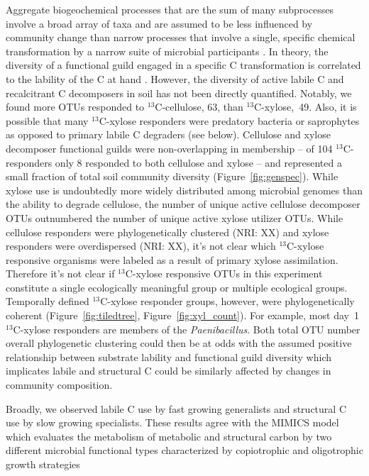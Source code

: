 Aggregate biogeochemical processes that are the sum of
many subprocesses involve a broad array of taxa and are assumed to be less
influenced by community change than narrow processes that involve a single,
specific chemical transformation by a narrow suite of microbial participants
\citep{Schimel_1995,McGuire2010}. In theory, the diversity of a functional
guild engaged in a specific C transformation is correlated to the lability of
the C at hand \citep{McGuire2010}. However, the diversity of active labile C and
recalcitrant C decomposers in soil has not been directly quantified. Notably,
we found more OTUs responded to $^{13}$C-cellulose, 63, than
$^{13}$C-xylose,~49. Also, it is possible that many $^{13}$C-xylose responders
were predatory bacteria or saprophytes as opposed to primary labile C degraders
(see below). Cellulose and xylose decomposer functional guilds were
non-overlapping in membership -- of 104 $^{13}$C-responders only 8 responded to
both cellulose and xylose -- and represented a small fraction of total soil
community diversity (Figure~\ref{fig:genspec}). While xylose use is undoubtedly
more widely distributed among microbial genomes than the ability to degrade
cellulose, the number of unique active cellulose decomposer OTUs outnumbered
the number of unique active xylose utilizer OTUs. While cellulose responders
were phylogenetically clustered (NRI: XX) and xylose responders were
overdispersed (NRI: XX), it's not clear which $^{13}$C-xylose responsive
organisms were labeled as a result of primary xylose assimilation. Therefore
it's not clear if $^{13}$C-xylose responsive OTUs in this experiment constitute
a single ecologically meaningful group or multiple ecological groups.
Temporally defined $^{13}$C-xylose responder groups, however, were
phylogenetically coherent (Figure~\ref{fig:tiledtree},
Figure~\ref{fig:xyl_count}). For example, most day~1 $^{13}$C-xylose responders
are members of the \textit{Paenibacillus}. Both total OTU number overall
phylogenetic clustering could then be at odds with the assumed positive
relationship between substrate lability and functional guild diversity which
implicates labile and structural C could be similarly affected by changes in
community composition. 

Broadly, we observed labile C use by fast growing generalists and structural
C use by slow growing specialists. These results agree with the MIMICS model
which evaluates the metabolism of metabolic and structural carbon by two
different microbial functional types characterized by copiotrophic and
oligotrophic growth strategies 

